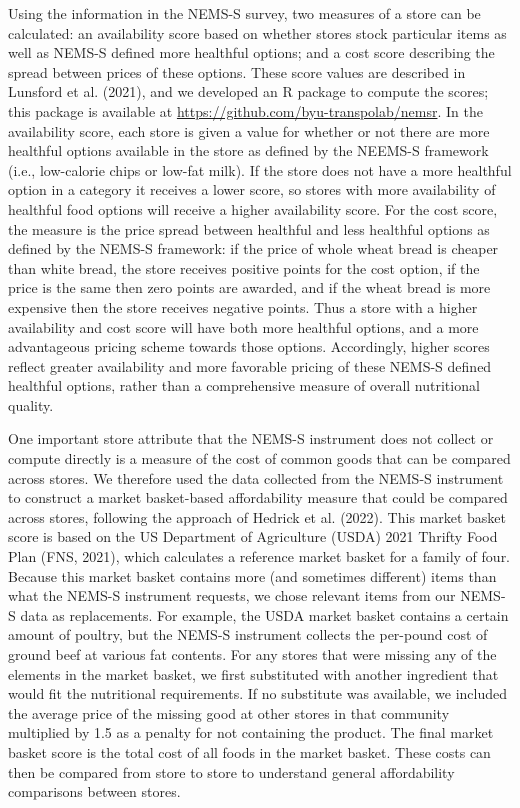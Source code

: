 \documentclass[
  letterpaper,
  number,
  review,
  3p]{elsarticle}
\begin{document}
Using the information in the NEMS-S survey, two measures of a store can
be calculated: an availability score based on whether stores stock
particular items as well as NEMS-S defined more healthful options; and a
cost score describing the spread between prices of these options. These
score values are described in Lunsford et al. (2021), and we developed
an R package to compute the scores; this package is available at
\url{https://github.com/byu-transpolab/nemsr}. In the availability
score, each store is given a value for whether or not there are more
healthful options available in the store as defined by the NEEMS-S
framework (i.e., low-calorie chips or low-fat milk). If the store does
not have a more healthful option in a category it receives a lower
score, so stores with more availability of healthful food options will
receive a higher availability score. For the cost score, the measure is
the price spread between healthful and less healthful options as defined
by the NEMS-S framework: if the price of whole wheat bread is cheaper
than white bread, the store receives positive points for the cost
option, if the price is the same then zero points are awarded, and if
the wheat bread is more expensive then the store receives negative
points. Thus a store with a higher availability and cost score will have
both more healthful options, and a more advantageous pricing scheme
towards those options. Accordingly, higher scores reflect greater
availability and more favorable pricing of these NEMS-S defined
healthful options, rather than a comprehensive measure of overall
nutritional quality.

One important store attribute that the NEMS-S instrument does not
collect or compute directly is a measure of the cost of common goods
that can be compared across stores. We therefore used the data collected
from the NEMS-S instrument to construct a market basket-based
affordability measure that could be compared across stores, following
the approach of Hedrick et al. (2022). This market basket score is based
on the US Department of Agriculture (USDA) 2021 Thrifty Food Plan (FNS,
2021), which calculates a reference market basket for a family of four.
Because this market basket contains more (and sometimes different) items
than what the NEMS-S instrument requests, we chose relevant items from
our NEMS-S data as replacements. For example, the USDA market basket
contains a certain amount of poultry, but the NEMS-S instrument collects
the per-pound cost of ground beef at various fat contents. For any
stores that were missing any of the elements in the market basket, we
first substituted with another ingredient that would fit the nutritional
requirements. If no substitute was available, we included the average
price of the missing good at other stores in that community multiplied
by 1.5 as a penalty for not containing the product. The final market
basket score is the total cost of all foods in the market basket. These
costs can then be compared from store to store to understand general
affordability comparisons between stores.
\end{document}
